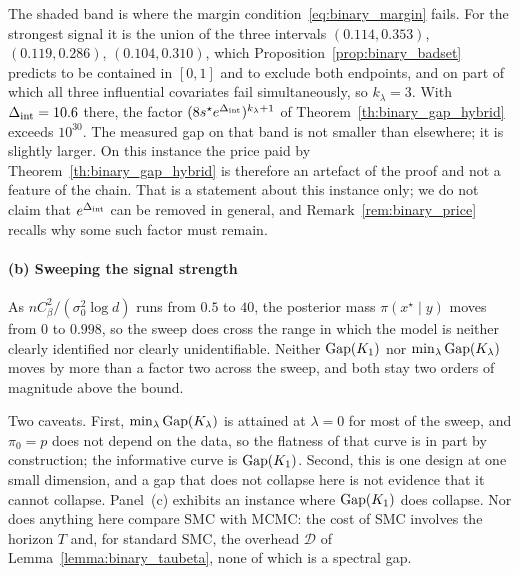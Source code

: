 \documentclass[aos]{imsart}%
\theoremstyle{plain}
\theoremstyle{definition}
\begin{document}
    The shaded band is where the margin condition~\eqref{eq:binary_margin}
    fails. For the strongest signal it is the union of the three intervals
    $(0.114,0.353)$, $(0.119,0.286)$, $(0.104,0.310)$, which
    Proposition~\ref{prop:binary_badset} predicts to be contained in $[0,1]$
    and to exclude both endpoints, and on part of which all three influential
    covariates fail simultaneously, so $k_\lambda=3$. With
    $\Delta_{\mathrm{int}}=10.6$ there, the factor
    $(8s^{\star}e^{\Delta_{\mathrm{int}}})^{k_\lambda+1}$ of
    Theorem~\ref{th:binary_gap_hybrid} exceeds $10^{30}$. The measured gap on
    that band is not smaller than elsewhere; it is slightly larger. On this
    instance the price paid by Theorem~\ref{th:binary_gap_hybrid} is therefore
    an artefact of the proof and not a feature of the chain. That is a
    statement about this instance only; we do not claim that
    $e^{\Delta_{\mathrm{int}}}$ can be removed in general, and
    Remark~\ref{rem:binary_price} recalls why some such factor must remain.

    \paragraph{(b) Sweeping the signal strength}
    As $nC_\beta^{2}/(\sigma_0^{2}\log d)$ runs from $0.5$ to $40$, the
    posterior mass $\pi(x^{\star}\mid y)$ moves from $0$ to $0.998$, so the
    sweep does cross the range in which the model is neither clearly
    identified nor clearly unidentifiable. Neither $\mathrm{Gap}(K_1)$ nor
    $\min_{\lambda}\mathrm{Gap}(K_\lambda)$ moves by more than a factor two across the
    sweep, and both stay two orders of magnitude above the bound.

    Two caveats. First, $\min_\lambda\mathrm{Gap}(K_\lambda)$ is attained at
    $\lambda=0$ for most of the sweep, and $\pi_0=p$ does not depend on the
    data, so the flatness of that curve is in part by construction; the
    informative curve is $\mathrm{Gap}(K_1)$. Second, this is one design at one small
    dimension, and a gap that does not collapse here is not evidence that it
    cannot collapse. Panel~(c) exhibits an instance where $\mathrm{Gap}(K_1)$ does
    collapse. Nor does anything here compare SMC with MCMC: the cost of SMC
    involves the horizon $T$ and, for standard SMC, the overhead $\mathcal D$
    of Lemma~\ref{lemma:binary_taubeta}, none of which is a spectral gap.
\end{document}
